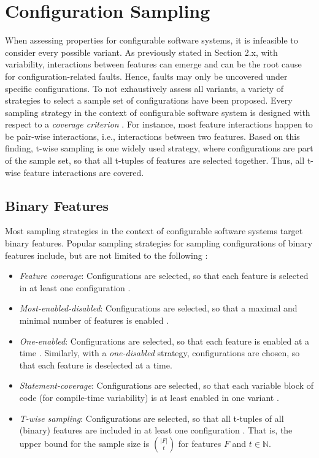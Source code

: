 \section{Configuration Sampling}\label{sec:configuration_sam}
When assessing properties for configurable software systems, it is infeasible
to consider every possible variant. As previously stated in Section 2.x, with
variability, interactions between features can emerge and can be the root cause
for configuration-related faults. Hence, faults may only be uncovered under
specific configurations. To not exhaustively assess all variants, a variety of
strategies to select a sample set of configurations have been proposed.
Every sampling strategy in the context of configurable software system is
designed with respect to a \emph{coverage criterion} 
\citep{apel_feature-oriented_2013}. For instance, most feature interactions
happen to be pair-wise interactions, i.e., interactions between two features.
Based on this finding, t-wise sampling is one widely used
strategy, where configurations are part of the sample set, so that all t-tuples
of features are selected together. Thus, all t-wise feature interactions are
covered. 

\subsection{Binary Features}
Most sampling strategies in the context of configurable software systems
target binary features. Popular sampling strategies for sampling configurations
of binary features include, but are not limited to the following
\citep{apel_feature-oriented_2013,medeiros_comparison_2016}:

\begin{itemize}
  \item \emph{Feature coverage}: Configurations are selected, so that each
  feature is selected in at least one configuration
  \citep{apel_feature-oriented_2013}.
  
  \item \emph{Most-enabled-disabled}: Configurations are selected, so that a
  maximal and minimal number of features is enabled
  \citep{medeiros_comparison_2016}.
  
  \item \emph{One-enabled}: Configurations are selected, so
  that each feature is enabled at a time \citep{abal_42_2014}. Similarly, with a
  \emph{one-disabled} strategy, configurations are chosen, so that each feature
  is deselected at a time.
  
  \item \emph{Statement-coverage}: Configurations are
  selected, so that each variable block of code (for
  compile-time variability) is at least enabled in one
  variant \citep{tartler_static_2014}.
  
  \item \emph{T-wise sampling}: Configurations are selected, so that all
  t-tuples of all (binary) features are included in at least one configuration
  \citep{williams_practical_1996}. That is, the upper bound for the sample size
  is $\binom{|F|}{t}$ for features $F$ and $t \in \mathbb{N}$.

\end{itemize}

